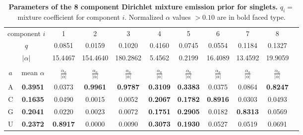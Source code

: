 \begin{table}
\footnotesize
\begin{center}
\begin{tabular}{|c|c|c|c|c|c|c|c|c|c|c|} \hline
\multicolumn{2}{|c|}{component $i$} & 1 & 2 & 3 & 4 & 5 & 6 & 7 & 8 \\
\multicolumn{2}{|c|}{$q$} & 0.0851 & 0.0159 & 0.1020 & 0.4160 & 0.0745 & 0.0554 & 0.1184 & 0.1327 \\  
\multicolumn{2}{|c|}{$|\alpha|$} & 15.4467 & 154.4640 & 180.2862 & 5.4562 & 0.2199 & 16.4089 & 13.4592 & 19.9059 \\ \hline 
\multicolumn{10}{c}{} \\ \hline

$a$ & mean $\alpha$ & $\frac{\alpha_a}{|\alpha|}$ & $\frac{\alpha_a}{|\alpha|}$ & $\frac{\alpha_a}{|\alpha|}$ & $\frac{\alpha_a}{|\alpha|}$ & $\frac{\alpha_a}{|\alpha|}$ & $\frac{\alpha_a}{|\alpha|}$ & $\frac{\alpha_a}{|\alpha|}$ & $\frac{\alpha_a}{|\alpha|}$ \\ \hline 
A & \textbf{0.3951} & 0.0373 & \textbf{0.9961} & \textbf{0.9787} & \textbf{0.3109} & \textbf{0.3383} & 0.0375 & 0.0864 & \textbf{0.8247} \\  
C & \textbf{0.1635} & 0.0490 & 0.0015 & 0.0052 & \textbf{0.2067} & \textbf{0.1782} & \textbf{0.8916} & 0.0303 & 0.0493 \\  
G & \textbf{0.2041} & 0.0220 & 0.0023 & 0.0072 & \textbf{0.1751} & \textbf{0.2905} & 0.0182 & \textbf{0.8313} & 0.0569 \\  
U & \textbf{0.2372} & \textbf{0.8917} & 0.0000 & 0.0090 & \textbf{0.3073} & \textbf{0.1930} & 0.0527 & 0.0519 & 0.0691 \\ \hline 


\end{tabular}
\end{center}

\normalfont\rmfamily
\caption{\textbf{Parameters of the 8 component Dirichlet mixture
    emission prior for singlets.} $q_i =$ mixture coefficient for
    component $i$. Normalized $\alpha$ values $> 0.10$ are in bold
    faced type.}
\label{tbl:singlets}
\end{table}
